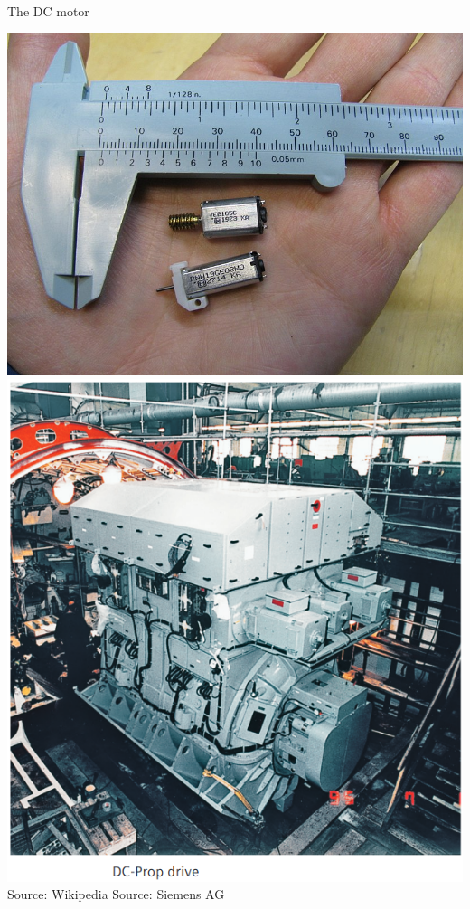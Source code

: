 \documentclass[presentation,aspectratio=169]{beamer}
\begin{document}
\begin{frame}[label={sec:org9cc0a64}]{The DC motor}
\begin{center}
\includegraphics[height=0.6\textheight]{../../figures/wiki-small-dc-motor.jpg}
\includegraphics[width=0.6\textheight]{../../figures/Siemens-DC-prop.png}\\
{\footnotesize Source: Wikipedia \hspace*{3cm} Source: Siemens AG}
\end{center}
\end{frame}
\end{document}
